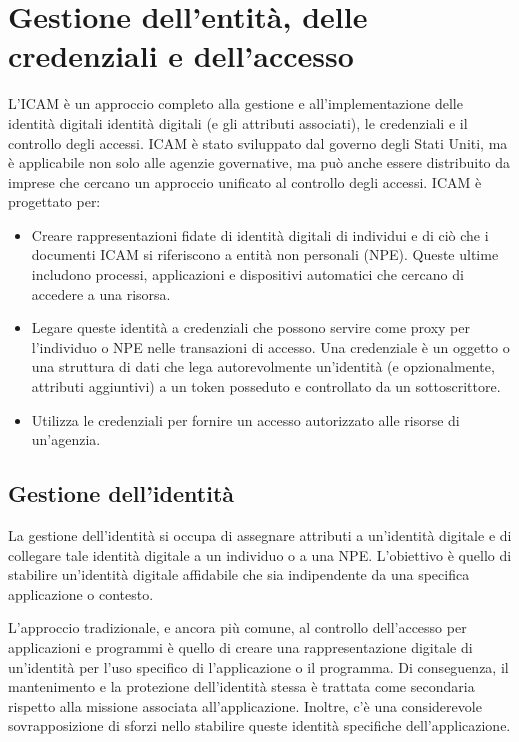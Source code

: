 \section{Gestione dell'entità, delle credenziali e dell'accesso}
L'ICAM è un approccio completo alla gestione e all'implementazione delle identità digitali identità digitali (e gli attributi associati), le credenziali e il controllo degli accessi. ICAM è stato sviluppato dal governo degli Stati Uniti, ma è applicabile non solo alle agenzie governative, ma può anche essere distribuito da imprese che cercano un approccio unificato al controllo degli accessi. ICAM è progettato per:
\begin{itemize}

    \item Creare rappresentazioni fidate di identità digitali di individui e di ciò che i documenti ICAM si riferiscono a entità non personali (NPE). Queste ultime includono processi, applicazioni e dispositivi automatici che cercano di accedere a una risorsa.
    
    \item Legare queste identità a credenziali che possono servire come proxy per l'individuo o NPE nelle transazioni di accesso. Una credenziale è un oggetto o una struttura di dati che lega autorevolmente un'identità (e opzionalmente, attributi aggiuntivi) a un token posseduto e controllato da un sottoscrittore.
    
    \item Utilizza le credenziali per fornire un accesso autorizzato alle risorse di un'agenzia.
\end{itemize}
\newpage
\subsection{Gestione dell'identità}
La gestione dell'identità si occupa di assegnare attributi a un'identità digitale e di collegare tale identità digitale a un individuo o a una NPE. L'obiettivo è quello di stabilire un'identità digitale affidabile che sia indipendente da una specifica applicazione o contesto.

\singlespacing

L'approccio tradizionale, e ancora più comune, al controllo dell'accesso per applicazioni e programmi è quello di creare una rappresentazione digitale di un'identità per l'uso specifico di l'applicazione o il programma. Di conseguenza, il mantenimento e la protezione dell'identità stessa è trattata come secondaria rispetto alla missione associata all'applicazione. Inoltre, c'è una considerevole sovrapposizione di sforzi nello stabilire queste identità specifiche dell'applicazione.

